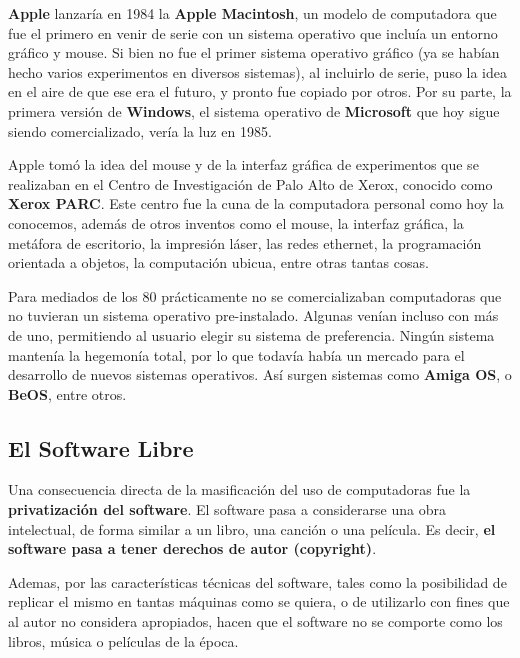 \textbf{Apple} lanzaría en 1984 la \textbf{Apple Macintosh}, un modelo de
computadora que fue el primero en venir de serie con un sistema operativo que
incluía un entorno gráfico y mouse. Si bien no fue el primer sistema operativo
gráfico (ya se habían hecho varios experimentos en diversos sistemas), al
incluirlo de serie, puso la idea en el aire de que ese era el futuro, y pronto
fue copiado por otros. Por su parte, la primera versión de \textbf{Windows},
el sistema operativo de \textbf{Microsoft} que hoy sigue siendo comercializado,
vería la luz en 1985.

\begin{knowwhat}
    Apple tomó la idea del mouse y de la interfaz gráfica de experimentos que se
    realizaban en el Centro de Investigación de Palo Alto de Xerox, conocido como
    \textbf{Xerox PARC}. Este centro fue la cuna de la computadora personal como
    hoy la conocemos, además de otros inventos como el mouse, la interfaz gráfica,
    la metáfora de escritorio, la impresión láser, las redes ethernet, la programación
    orientada a objetos, la computación ubicua, entre otras tantas cosas.\autocite{haltzik_2000}
\end{knowwhat}

Para mediados de los 80 prácticamente no se comercializaban computadoras que no
tuvieran un sistema operativo pre-instalado. Algunas venían incluso con más de
uno, permitiendo al usuario elegir su sistema de preferencia. Ningún sistema
mantenía la hegemonía total, por lo que todavía había un mercado para el
desarrollo de nuevos sistemas operativos. Así surgen sistemas como \textbf{Amiga OS},
o \textbf{BeOS}, entre otros.

\subsection{El Software Libre}

Una consecuencia directa de la masificación del uso de computadoras fue la
\textbf{privatización del software}. El software pasa a considerarse una
obra intelectual, de forma similar a un libro, una canción o una película. Es
decir, \textbf{el software pasa a tener derechos de autor (copyright)}.

Ademas, por las características técnicas del software, tales como la
posibilidad de replicar el mismo en tantas máquinas como se quiera, o de
utilizarlo con fines que al autor no considera apropiados, hacen que el software
no se comporte como los libros, música o películas de la época.

